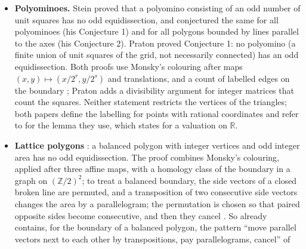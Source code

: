 \documentclass[11pt]{article}
\theoremstyle{definition}
\newcommand{\Z}{\mathbb{Z}}
\newcommand{\R}{\mathbb{R}}
\begin{document}
\begin{itemize}
parallel, equal in length and have opposite orientation''), \cite{Rud} for \emph{special} polygons
as in Definition~\ref{def:special}. A balanced polygon is special, and a special polygon becomes
balanced after subdividing edges (Section~\ref{sec:limits}, item~3). Stein's own formulation
\cite[p.~141]{Ste00} is that of Definition~\ref{def:special}, for a ``simply connected polygon''
with oriented boundary, and the conjecture reads: ``A special polygon cannot be cut into an odd
number of triangles of equal areas.'' In the same paper he proves it for special polygons with at
most six sides, with real vertices (his Theorems 1 and 2, by Monsky's colouring for a $2$-adic
valuation on $\R$ after suitable affine maps), and says without details that similar arguments
settle ``several families of special polygons with more than six sides'' \cite[p.~145]{Ste00}.
\item \textbf{Polyominoes.} Stein \cite[p.~256]{Ste99} proved that a polyomino consisting of an
odd number of unit squares has no odd equidissection, and conjectured the same for all polyominoes
(his Conjecture 1) and for all polygons bounded by lines parallel to the axes (his Conjecture 2).
Praton \cite[Theorem 6]{Pra} proved Conjecture 1: no polyomino (a finite union of unit squares of
the grid, not necessarily connected) has an odd equidissection. Both proofs use Monsky's colouring
after maps $(x,y)\mapsto(x/2^r,y/2^s)$ and translations, and a count of labelled edges on the
boundary \cite[Chapter 5]{SS}; Praton adds a divisibility argument for integer matrices that count
the squares. Neither statement restricts the vertices of the triangles; both papers define the
labelling for points with rational coordinates and refer to \cite{Mon70,SS} for the lemma they use,
which \cite[p.~118]{SS} states for a valuation on $\R$.
\item \textbf{Lattice polygons} \cite{Rud12}: a balanced polygon with integer vertices and odd
integer area has no odd equidissection. The proof combines Monsky's colouring, applied after three
affine maps, with a homology class of the boundary in a graph on $(\Z/2)^2$; to treat a balanced
boundary, the side vectors of a closed broken line are permuted, and a transposition of two
consecutive side vectors changes the area by a parallelogram; the permutation is chosen so that
paired opposite sides become consecutive, and then they cancel \cite[Section 5, proof of Lemma
5]{Rud12}. So \cite{Rud12} already contains, for the boundary of a balanced polygon, the pattern
``move parallel vectors next to each other by transpositions, pay parallelograms, cancel'' of

\end{itemize}
\end{document}
